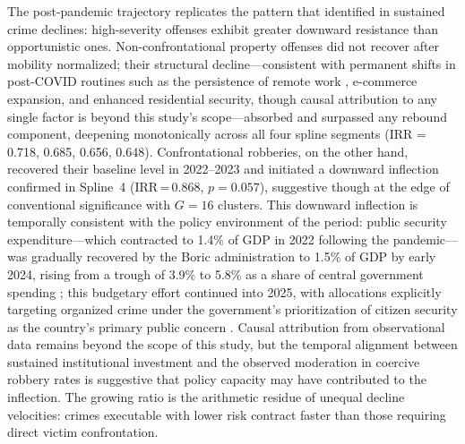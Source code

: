 \documentclass[pdflatex,sn-basic]{sn-jnl}
\begin{document}
The post-pandemic trajectory replicates the pattern that \citet{blumstein1988} identified in sustained crime declines: high-severity offenses exhibit greater downward resistance than opportunistic ones. Non-confrontational property offenses did not recover after mobility normalized; their structural decline---consistent with permanent shifts in post-COVID routines such as the persistence of remote work \citep{seyidoglu2024}, e-commerce expansion, and enhanced residential security, though causal attribution to any single factor is beyond this study's scope---absorbed and surpassed any rebound component, deepening monotonically across all four spline segments (IRR = 0.718, 0.685, 0.656, 0.648). Confrontational robberies, on the other hand, recovered their baseline level in 2022--2023 and initiated a downward inflection confirmed in Spline~4 (IRR\,=\,0.868, $p=0.057$), suggestive though at the edge of conventional significance with $G=16$ clusters. This downward inflection is temporally consistent with the policy environment of the period: public security expenditure---which contracted to 1.4\% of GDP in 2022 following the pandemic---was gradually recovered by the Boric administration to 1.5\% of GDP by early 2024, rising from a trough of 3.9\% to 5.8\% as a share of central government spending \citep{dominguez2023gasto}; this budgetary effort continued into 2025, with allocations explicitly targeting organized crime under the government's prioritization of citizen security as the country's primary public concern \citep{diaz2024presupuesto}. Causal attribution from observational data remains beyond the scope of this study, but the temporal alignment between sustained institutional investment and the observed moderation in coercive robbery rates is suggestive that policy capacity may have contributed to the inflection. The growing ratio is the arithmetic residue of unequal decline velocities: crimes executable with lower risk contract faster than those requiring direct victim confrontation.
\end{document}
